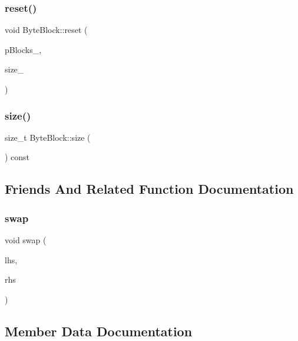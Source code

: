 \mbox{\label{class_byte_block_aba0c3bafa18238bb269ec40962baa3c1}} 
\subsubsection{reset()}
{\footnotesize\ttfamily void Byte\+Block\+::reset (\begin{DoxyParamCaption}\item[{const \textbf{ B\+Y\+TE} $\ast$}]{p\+Blocks\+\_\+,  }\item[{size\+\_\+t}]{size\+\_\+ }\end{DoxyParamCaption})}

\mbox{\label{class_byte_block_a160a348384c35cd7beae4e123b74bf18}} 
\subsubsection{size()}
{\footnotesize\ttfamily size\+\_\+t Byte\+Block\+::size (\begin{DoxyParamCaption}{ }\end{DoxyParamCaption}) const}



\subsection{Friends And Related Function Documentation}
\mbox{\label{class_byte_block_aff71aa0d084ae3b604be05fa66e1d4cd}} 
\subsubsection{swap}
{\footnotesize\ttfamily void swap (\begin{DoxyParamCaption}\item[{\textbf{ Byte\+Block} \&}]{lhs,  }\item[{\textbf{ Byte\+Block} \&}]{rhs }\end{DoxyParamCaption})\hspace{0.3cm}{\ttfamily [friend]}}



\subsection{Member Data Documentation}
\mbox{\label{class_byte_block_a96ef9896e7d4a252485bbac909c7cb76}} 
